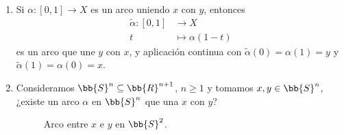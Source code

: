 \begin{ejemplo}
\begin{enumerate}
        \item Si $\alpha:[0,1]\to X$ es un arco uniendo $x$ con $y$, entonces
        \begin{align*}
            \tilde{\alpha}:[0,1]&\to X\\
            t & \mapsto \alpha(1-t)
        \end{align*}
        es un arco que une $y$ con $x$, y aplicación continua con $\tilde{\alpha}(0)=\alpha(1)=y$ y $\tilde{\alpha}(1)=\alpha(0)=x$.

        \item Consideramos $\bb{S}^n\subseteq \bb{R}^{n+1}$, $n\geq 1$ y tomamos $x,y\in \bb{S}^n$, ¿existe un arco $\alpha$ en $\bb{S}^n$ que una $x$ con $y$?\\
        
        \begin{figure}[H]
            \centering
            \caption{Arco entre $x$ e $y$ en $\bb{S}^2$.}
            \label{fig:arcos_s2}
        \end{figure}


\end{enumerate}
\end{ejemplo}
